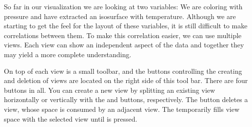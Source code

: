 So far in our visualization we are looking at two variables: We are
coloring with pressure and have extracted an isosurface with temperature.
Although we are starting to get the feel for the layout of these variables,
it is still difficult to make correlations between them.  To make this
correlation easier, we can use multiple views.  Each view can show an
independent aspect of the data and together they may yield a more complete
understanding.

On top of each view is a small toolbar, and the buttons controlling the
creating and deletion of views are located on the right side of this tool
bar.  There are four buttons in all.  You can create a new view by
splitting an existing view horizontally or vertically with the \splitViewH
and \splitViewV buttons, respectively.  The \deleteView button deletes a
view, whose space is consumed by an adjacent view.  The \maximizeView
temporarily fills view space with the selected view until \restoreView is
pressed.

